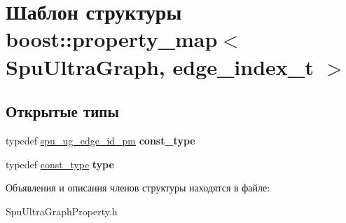 \hypertarget{structboost_1_1property__map_3_01_spu_ultra_graph_00_01edge__index__t_01_4}{}\section{Шаблон структуры boost\+:\+:property\+\_\+map$<$ Spu\+Ultra\+Graph, edge\+\_\+index\+\_\+t $>$}
\label{structboost_1_1property__map_3_01_spu_ultra_graph_00_01edge__index__t_01_4}
\subsection*{Открытые типы}
\begin{DoxyCompactItemize}
\item 
\mbox{\label{structboost_1_1property__map_3_01_spu_ultra_graph_00_01edge__index__t_01_4_a6e303c45da30037ee413ce26e7f39f19}} 
typedef \hyperlink{classboost_1_1spu__ug__readable__property__map}{spu\+\_\+ug\+\_\+edge\+\_\+id\+\_\+pm} {\bfseries const\+\_\+type}
\item 
\mbox{\label{structboost_1_1property__map_3_01_spu_ultra_graph_00_01edge__index__t_01_4_ad59cc33d18bb1d4766416233f95353c9}} 
typedef \hyperlink{classboost_1_1spu__ug__readable__property__map}{const\+\_\+type} {\bfseries type}
\end{DoxyCompactItemize}


Объявления и описания членов структуры находятся в файле\+:\begin{DoxyCompactItemize}
\item 
Spu\+Ultra\+Graph\+Property.\+h\end{DoxyCompactItemize}
